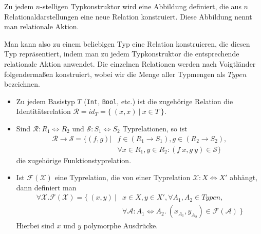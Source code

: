 \begin{mydef}
Zu jedem $n$-stelligen Typkonstruktor wird eine Abbildung definiert, die aus $n$ Relationaldarstellungen eine neue Relation konstruiert.
Diese Abbildung nennt man relationale Aktion.
\end{mydef}




Man kann also zu einem beliebigen Typ eine Relation konstruieren, die diesen Typ repräsentiert, indem man zu jedem Typkonstruktor
die entsprechende relationale Aktion anwendet. Die einzelnen Relationen werden nach Voigtländer \cite{voigtlander} folgendermaßen konstruiert, wobei wir die Menge aller Typmengen als $Typen$ bezeichnen.

\begin{itemize}
\item Zu jedem Basistyp $T$ (\texttt{Int}, \texttt{Bool}, etc.) ist die zugehörige Relation die Identitätsrelation $\mathcal{R} = id_{T} = \{~(x, x)~|~x \in T~\}$.
\item Sind $\mathcal{R} : R_1 \Leftrightarrow R_2$ und $\mathcal{S} : S_1 \Leftrightarrow S_2$ Typrelationen, so ist
\begin{align*}
\mathcal{R} \rightarrow \mathcal{S} = \{ (f, g) | & f \in (R_1 \rightarrow S_1), g \in (R_2 \rightarrow S_2),\\
& \forall x \in R_1, y \in R_2: (f\ x, g\ y) \in \mathcal{S} \}
\end{align*}
die zugehörige Funktionstyprelation.
\item Ist $\mathcal{F}(\mathcal{X})$ eine Typrelation, die von einer Typrelation $\mathcal{X} : X \Leftrightarrow X'$ abhängt,
dann definiert man
\begin{align*}
\forall \mathcal{X} . \mathcal{F}(\mathcal{X}) = \{~(x, y)~|& x \in X, y \in X', \forall A_1, A_2 \in Typen,\\
&\forall \mathcal{A} : A_1 \Leftrightarrow A_2.~ (x_{A_1}, y_{A_2}) \in \mathcal{F}(\mathcal{A})~\}
\end{align*}
Hierbei sind $x$ und $y$ polymorphe Ausdrücke.
\end{itemize}

